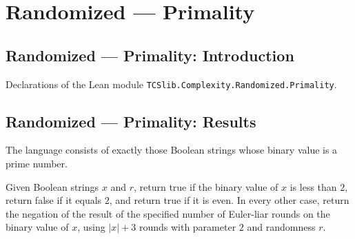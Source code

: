\section{Randomized --- Primality}
\subsection*{Randomized --- Primality: Introduction}

Declarations of the Lean module \texttt{TCSlib.Complexity.Randomized.Primality}.

\subsection*{Randomized --- Primality: Results}

\begin{definition}
\label{Randomized.PRIMESBin}
\leanok
{}
The language consists of exactly those Boolean strings whose binary value is a prime
number.
\end{definition}

\begin{definition}
\label{Randomized.compositeVerifier}
\leanok
{}
Given Boolean strings $x$ and $r$, return true if the binary value of $x$ is less than
$2$, return false if it equals $2$, and return true if it is even. In every other case,
return the negation of the result of the specified number of Euler-liar rounds on the
binary value of $x$, using $|x|+3$ rounds with parameter $2$ and randomness $r$.
\end{definition}

